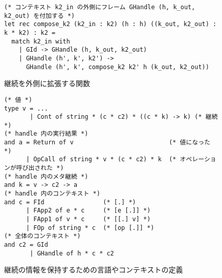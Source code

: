\begin{figure}[t]
\begin{spacing}{0.8}
\begin{verbatim}
(* コンテキスト k2_in の外側にフレーム GHandle (h, k_out, k2_out) を付加する *)
let rec compose_k2 (k2_in : k2) (h : h) ((k_out, k2_out) : k * k2) : k2 =
  match k2_in with
    | GId -> GHandle (h, k_out, k2_out)
    | GHandle (h', k', k2') ->
      GHandle (h', k', compose_k2 k2' h (k_out, k2_out))
\end{verbatim}
\end{spacing}
\caption{継続を外側に拡張する関数}
\label{figure:compose}
\end{figure}

\begin{figure}[t]
\begin{spacing}{0.8}
\begin{verbatim}
(* 値 *)
type v = ...
       | Cont of string * (c * c2) * ((c * k) -> k) (* 継続 *)
(* handle 内の実行結果 *)
and a = Return of v                          (* 値になった *)
      | OpCall of string * v * (c * c2) * k  (* オペレーションが呼び出された *)
(* handle 内のメタ継続 *)
and k = v -> c2 -> a
(* handle 内のコンテキスト *)
and c = FId                (* [.] *)
      | FApp2 of e * c     (* [e [.]] *)
      | FApp1 of v * c     (* [[.] v] *)
      | FOp of string * c  (* [op [.]] *)
(* 全体のコンテキスト *)
and c2 = GId
       | GHandle of h * c * c2
\end{verbatim}
\end{spacing}
\caption{継続の情報を保持するための言語やコンテキストの定義}
\label{figure:k_6cps}
\end{figure}

